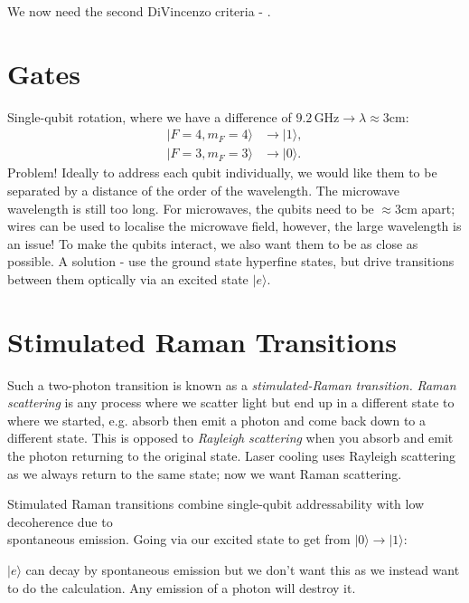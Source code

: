 \documentclass[a4paper, 11pt, normalem]{report}
\begin{document}
We now need the second DiVincenzo criteria - .

\section{Gates}
Single-qubit rotation, where we have a difference of $9.2\,$GHz$\to\lambda\approx3$cm:
\begin{align*}
    |F=4,m_F=4\rangle &\to |1\rangle, \\
    |F=3,m_F=3\rangle &\to |0\rangle.
\end{align*}
Problem!
Ideally to address each qubit individually, we would like them to be separated by a distance of the order of the wavelength.
The microwave wavelength is still too long.
For microwaves, the qubits need to be $\approx3$cm apart; wires can be used to localise the microwave field, however, the large wavelength is an issue!
To make the qubits interact, we also want them to be as close as possible.
A solution - use the ground state hyperfine states, but drive transitions between them optically via an excited state $|e\rangle$.

\section{Stimulated Raman Transitions}
Such a two-photon transition is known as a \emph{stimulated-Raman transition.}
\emph{Raman scattering} is any process where we scatter light but end up in a different state to where we started, e.g. absorb then emit a photon and come back down to a different state.
This is opposed to \emph{Rayleigh scattering} when you absorb and emit the photon returning to the original state.
Laser cooling uses Rayleigh scattering as we always return to the same state; now we want Raman scattering.

Stimulated Raman transitions combine single-qubit addressability with low decoherence due to \\spontaneous emission.
Going via our excited state to get from $|0\rangle\to|1\rangle$:
\begin{figure}[H]
    \centering
\end{figure}
$|e\rangle$ can decay by spontaneous emission but we don't want this as we instead want to do the calculation.
Any emission of a photon will destroy it.
\end{document}
